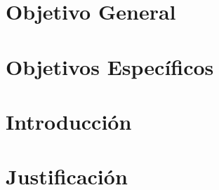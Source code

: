 \documentclass[11pt,dvipsnames]{report} %
\newcommand{\1}{\mathds{1}}
\begin{document}
\newtheorem{property}{Propiedad}[section]
\section*{Objetivo General}
\section*{Objetivos Específicos}
\section*{Introducción}
\section*{Justificación}








\end{document}
